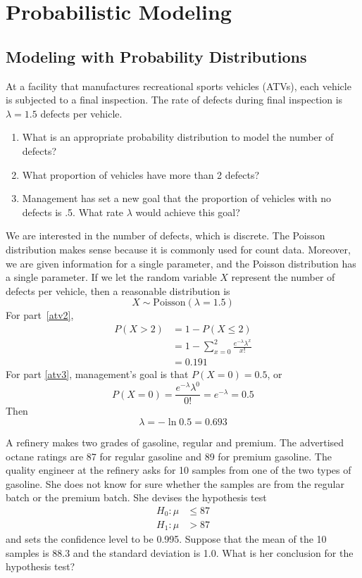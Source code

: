 \chapter{Probabilistic Modeling}

\section{Modeling with Probability Distributions}

At a facility that manufactures recreational sports
  vehicles (ATVs), each vehicle is subjected to a final
  inspection. The rate of defects during final inspection is
  $\lambda=1.5$ defects per vehicle.
\begin{enumerate}
\item What is an appropriate probability distribution to model the
number of defects? \label{atv1}
\item What proportion of vehicles have more than 2 defects? \label{atv2}
\item Management has set a new goal that the proportion
of vehicles with no defects is .5. What rate $\lambda$ would
achieve this goal? \label{atv3}
\end{enumerate}

We are interested in the number of defects, which is discrete.
The Poisson distribution makes sense because it is commonly used
for count data. Moreover, we are given information for a single
parameter, and the Poisson distribution has a single parameter.
If we let the random variable $X$ represent the number of defects
per vehicle, then a reasonable distribution is
\[ X \sim \text{Poisson}(\lambda=1.5) \]
For part~\ref{atv2},
\begin{align*}
P(X>2) &= 1 - P(X \leq 2)\\
       &= 1 - \sum_{x=0}^2 \frac{e^{-\lambda}\lambda^x}{x!}\\
       &= 0.191
\end{align*}
For part \ref{atv3}, management's goal is that $P(X=0)=0.5$, or
\[ P(X=0) = \frac{e^{-\lambda}\lambda^0}{0!} = e^{-\lambda}=0.5 \]
Then
\[ \lambda = -\ln{0.5} = 0.693 \]

A refinery makes two grades of gasoline, regular and premium.  The
advertised octane ratings are 87 for regular gasoline and 89 for
premium gasoline.  The quality engineer at the refinery asks for 10
samples from one of the two types of gasoline. She does not know for
sure whether the samples are from the regular batch or the premium
batch. She devises the hypothesis test
\begin{align*}
H_0: \mu &\leq 87 \\
H_1: \mu &> 87
\end{align*}
and sets the confidence level to be 0.995. Suppose that the mean of
the 10 samples is 88.3 and the standard deviation is 1.0. What is her
conclusion for the hypothesis test?


